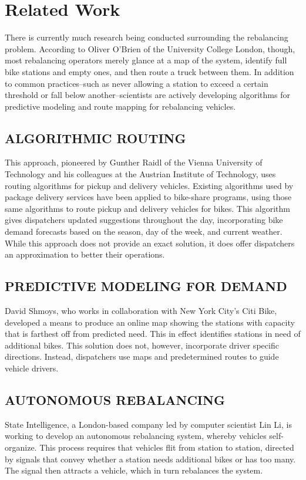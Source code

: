 \documentclass{sig-alternate}
\begin{document}
\section{Related Work}
\label{sec:related_work}
There is currently much research being conducted surrounding the rebalancing problem. According to Oliver O'Brien of the University College London, though, most rebalancing operators merely glance at a map of the system, identify full bike stations and empty ones, and then route a truck between them. In addition to common practices--such as never allowing a station to exceed a certain threshold or fall below another--scientists are actively developing algorithms for predictive modeling and route mapping for rebalancing vehicles.

\subsection{ALGORITHMIC ROUTING}
This approach, pioneered by Gunther Raidl of the Vienna University of Technology and his colleagues at the Austrian Institute of Technology, uses routing algorithms for pickup and delivery vehicles. Existing algorithms used by package delivery services have been applied to bike-share programs, using those same algorithms to route pickup and delivery vehicles for bikes. This algorithm gives dispatchers updated suggestions throughout the day, incorporating bike demand forecasts based on the season, day of the week, and current weather. While this approach does not provide an exact solution, it does offer dispatchers an approximation to better their operations.

\subsection{PREDICTIVE MODELING FOR DEMAND}
David Shmoys, who works in collaboration with New York City's Citi Bike, developed a means to produce an online map showing the stations with capacity that is farthest off from predicted need. This in effect identifies stations in need of additional bikes. This solution does not, however, incorporate driver specific directions. Instead, dispatchers use maps and predetermined routes to guide vehicle drivers.

\subsection{AUTONOMOUS REBALANCING}
State Intelligence, a London-based company led by computer scientist Lin Li, is working to develop an autonomous rebalancing system, whereby vehicles self-organize. This process requires that vehicles flit from station to station, directed by signals that convey whether a station needs additional bikes or has too many. The signal then attracts a vehicle, which in turn rebalances the system.
\end{document}
